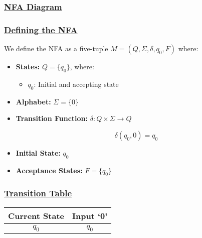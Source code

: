\documentclass[12pt]{article}
\begin{document}
	\subsubsection*{\underline{NFA Diagram}} 
	\begin{center} 
	\end{center} 
	
	\subsubsection*{\underline{Defining the NFA}} 
	We define the NFA as a five-tuple \(M = (Q, \Sigma, \delta, q_0, F)\) where: 
	
	\begin{itemize}[leftmargin=*] 
		\item \textbf{States:} \(Q = \{q_0\}\), where:
		\begin{itemize} 
			\item \(q_0\): Initial and accepting state 
		\end{itemize} 
		\item \textbf{Alphabet:} \(\Sigma = \{0\}\) 
		\item \textbf{Transition Function:} \(\delta: Q \times \Sigma \to Q\) 
		\begin{mdframed}[linewidth=1pt, leftmargin=3cm, rightmargin=3.2cm] 
			\[\delta(q_0, 0) = q_0\] 
		\end{mdframed} 
		\item \textbf{Initial State:} \(q_0\) 
		\item \textbf{Acceptance States:} \(F = \{q_0\}\) 
	\end{itemize} 
	
	\subsubsection*{\underline{Transition Table}} 
	\begin{center} 
		\begin{tabular}{cc} 
			\toprule 
			\textbf{Current State} & \textbf{Input `0'} \\ 
			\midrule 
			$q_0$ & $q_0$ \\ 
			\bottomrule 
		\end{tabular} 
	\end{center} 
	
\end{document}

